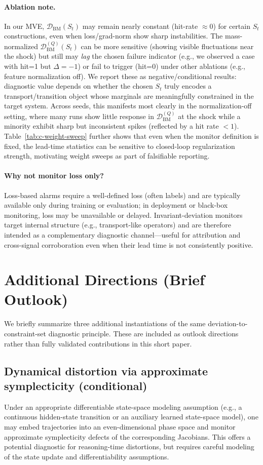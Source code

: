 \documentclass[11pt]{article}
\begin{document}
\paragraph{Ablation note.}
In our MVE, $\mathcal{D}_{\text{BM}}(S_t)$ may remain nearly constant (hit-rate $\approx 0$) for certain $S_t$ constructions, even when loss/grad-norm show sharp instabilities. The mass-normalized $\mathcal{D}^{(Q)}_{\text{BM}}(S_t)$ can be more sensitive (showing visible fluctuations near the shock) but still may \emph{lag} the chosen failure indicator (e.g., we observed a case with hit=1 but $\Delta=-1$) or fail to trigger (hit=0) under other ablations (e.g., feature normalization off). We report these as negative/conditional results: diagnostic value depends on whether the chosen $S_t$ truly encodes a transport/transition object whose marginals are meaningfully constrained in the target system. Across seeds, this manifests most clearly in the normalization-off setting, where many runs show little response in $\mathcal{D}_{\text{BM}}^{(Q)}$ at the shock while a minority exhibit sharp but inconsistent spikes (reflected by a hit rate $<1$).
Table~\ref{tab:c-weight-sweep} further shows that even when the monitor definition is fixed, the lead-time statistics can be sensitive to closed-loop regularization strength, motivating weight sweeps as part of falsifiable reporting.
\paragraph{Why not monitor loss only?}
Loss-based alarms require a well-defined loss (often labels) and are typically available only during training or evaluation; in deployment or black-box monitoring, loss may be unavailable or delayed. Invariant-deviation monitors target internal structure (e.g., transport-like operators) and are therefore intended as a complementary diagnostic channel---useful for attribution and cross-signal corroboration even when their lead time is not consistently positive.
\section{Additional Directions (Brief Outlook)}

We briefly summarize three additional instantiations of the same deviation-to-constraint-set diagnostic principle. These are included as outlook directions rather than fully validated contributions in this short paper.

\subsection{Dynamical distortion via approximate symplecticity (conditional)}
Under an appropriate differentiable state-space modeling assumption (e.g., a continuous hidden-state transition or an auxiliary learned state-space model), one may embed trajectories into an even-dimensional phase space and monitor approximate symplecticity defects of the corresponding Jacobians. This offers a potential diagnostic for reasoning-time distortions, but requires careful modeling of the state update and differentiability assumptions.
\end{document}
